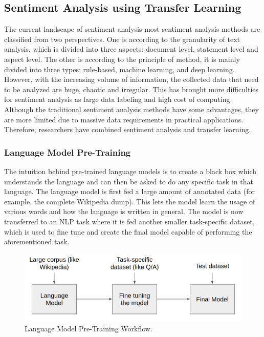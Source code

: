\documentclass[a4paper, 12pt]{article}
\begin{document}
\begin{sloppypar}
\subsection{Sentiment Analysis using Transfer Learning}

The current landscape of sentiment analysis most sentiment analysis methods are classified from two perspectives. One is according to the granularity of text analysis, which is divided into three aspects: document level, statement level and aspect level. The other is according to the principle of method, it is mainly divided into three types: rule-based, machine learning, and deep learning. However, with the increasing volume of information, the collected data that need to be analyzed are huge, chaotic and irregular. This has brought more difficulties for sentiment analysis as large data labeling and high cost of computing. Although the traditional sentiment analysis methods have some advantages, they are more limited due to massive data requirements in practical applications. Therefore, researchers have combined sentiment analysis and transfer learning. \cite{liu_survey_2019}

\subsubsection{Language Model Pre-Training}

The intuition behind pre-trained language models is to create a black box which understands the language and can then be asked to do any specific task in that language. The language model is first fed a large amount of annotated data (for example, the complete Wikipedia dump). This lets the model learn the usage of various words and how the language is written in general. The model is now transferred to an NLP task where it is fed another smaller task-specific dataset, which is used to fine tune and create the final model capable of performing the aforementioned task. \cite{ganesh_pre-trained_2019}

\begin{figure}[H]
\begin{center}
\includegraphics[scale=0.5]{lm.png}
\caption{ Language Model Pre-Training Workflow.\cite{ganesh_pre-trained_2019}} 
\end{center}
\end{figure}


\end{sloppypar}
\end{document}
